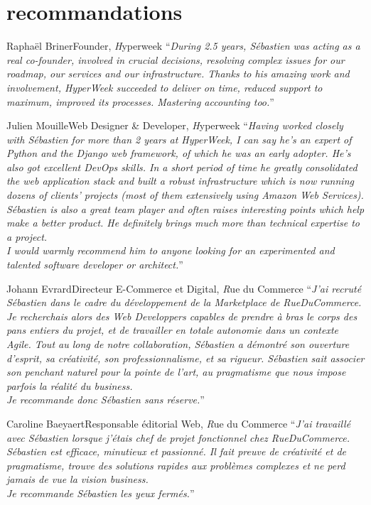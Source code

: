 \documentclass[]{friggeri}
\begin{document}
\clearpage

\section{recommandations}

\begin{quoting}{Raphaël Briner}{Founder, {\emph Hyperweek}}
``\textit{During 2.5 years, Sébastien was acting as a real co-founder,
involved in crucial decisions, resolving complex issues for our roadmap, our
services and our infrastructure. Thanks to his amazing work and involvement,
HyperWeek succeeded to deliver on time, reduced support to maximum, improved
its processes. Mastering accounting too.}''
\end{quoting}

\begin{quoting}{Julien Mouille}{Web Designer \& Developer, {\emph Hyperweek}}
``\textit{Having worked closely with Sébastien for more than 2 years at
HyperWeek, I can say he's an expert of Python and the Django web framework, of
which he was an early adopter. He's also got excellent DevOps skills. In a
short period of time he greatly consolidated the web application stack and
built a robust infrastructure which is now running dozens of clients' projects
(most of them extensively using Amazon Web Services).\\
Sébastien is also a great team player and often raises interesting points
which help make a better product. He definitely brings much more than
technical expertise to a project.\\
I would warmly recommend him to anyone looking for an experimented and
talented software developer or architect.}''
\end{quoting}

\begin{quoting}{Johann Evrard}{Directeur E-Commerce et Digital, {\emph Rue du Commerce}}
``\textit{J'ai recruté Sébastien dans le cadre du développement de la
Marketplace de RueDuCommerce. Je recherchais alors des Web Developpers
capables de prendre à bras le corps des pans entiers du projet, et de
travailler en totale autonomie dans un contexte Agile.
Tout au long de notre collaboration, Sébastien a démontré son ouverture
d'esprit, sa créativité, son professionnalisme, et sa rigueur. Sébastien sait
associer son penchant naturel pour la pointe de l'art, au pragmatisme que nous
impose parfois la réalité du business.\\
Je recommande donc Sébastien sans réserve.}''
\end{quoting}

\begin{quoting}{Caroline Baeyaert}{Responsable éditorial Web, {\emph Rue du Commerce}}
``\textit{J'ai travaillé avec Sébastien lorsque j'étais chef de projet fonctionnel
chez RueDuCommerce. Sébastien est efficace, minutieux et passionné. Il fait
preuve de créativité et de pragmatisme, trouve des solutions rapides aux
problèmes complexes et ne perd jamais de vue la vision business.\\
Je recommande Sébastien les yeux fermés.}''
\end{quoting}
\end{document}
